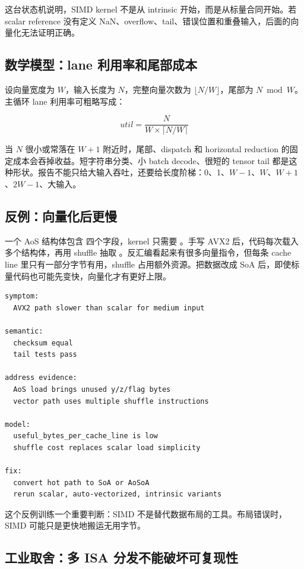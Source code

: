 这台状态机说明，SIMD kernel 不是从 intrinsic 开始，而是从标量合同开始。若 scalar reference 没有定义 NaN、overflow、tail、错误位置和重叠输入，后面的向量化无法证明正确。

\subsection{数学模型：lane 利用率和尾部成本}

设向量宽度为 \(W\)，输入长度为 \(N\)，完整向量次数为 \(\lfloor N/W \rfloor\)，尾部为 \(N \bmod W\)。主循环 lane 利用率可粗略写成：

\[
util = \frac{N}{W \times \lceil N/W \rceil}
\]

当 \(N\) 很小或常落在 \(W+1\) 附近时，尾部、dispatch 和 horizontal reduction 的固定成本会吞掉收益。短字符串分类、小 batch decode、很短的 tensor tail 都是这种形状。报告不能只给大输入吞吐，还要给长度阶梯：0、1、\(W-1\)、\(W\)、\(W+1\)、\(2W-1\)、大输入。

\subsection{反例：向量化后更慢}

一个 AoS 结构体包含  四个字段，kernel 只需要 。手写 AVX2 后，代码每次载入多个结构体，再用 shuffle 抽取 。反汇编看起来有很多向量指令，但每条 cache line 里只有一部分字节有用，shuffle 占用额外资源。把数据改成 SoA 后，即使标量代码也可能先变快，向量化才有更好上限。

\begin{lstlisting}[numbers=none,caption={SIMD 变慢事故复盘字段}]
symptom:
  AVX2 path slower than scalar for medium input

semantic:
  checksum equal
  tail tests pass

address evidence:
  AoS load brings unused y/z/flag bytes
  vector path uses multiple shuffle instructions

model:
  useful_bytes_per_cache_line is low
  shuffle cost replaces scalar load simplicity

fix:
  convert hot path to SoA or AoSoA
  rerun scalar, auto-vectorized, intrinsic variants
\end{lstlisting}

这个反例训练一个重要判断：SIMD 不是替代数据布局的工具。布局错误时，SIMD 可能只是更快地搬运无用字节。

\subsection{工业取舍：多 ISA 分发不能破坏可复现性}

